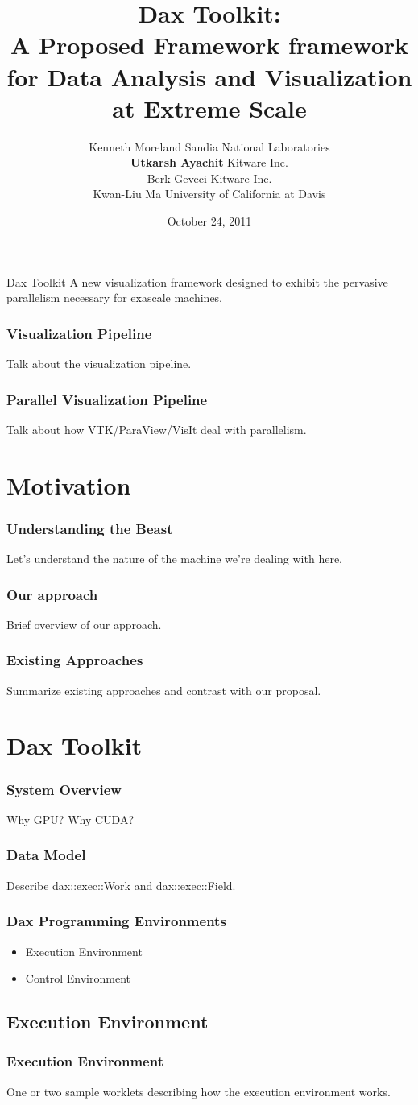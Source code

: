 \documentclass{beamer}
\title{\textbf{Dax Toolkit}: \\
  A Proposed Framework framework for Data Analysis and Visualization \\
  at Extreme Scale}
\author{\small
  Kenneth Moreland {\tiny Sandia National Laboratories} \\
  \textbf{Utkarsh Ayachit} {\tiny Kitware Inc. } \\
  Berk Geveci {\tiny Kitware Inc. }\\
  Kwan-Liu Ma {\tiny University of California at Davis}
}
\date {October 24, 2011}
\begin{document}
\frame{\titlepage}


\frame
{
  \begin{beamerboxesrounded}{Dax Toolkit}
  A new visualization framework designed to exhibit the pervasive parallelism
    necessary for exascale machines.
  \end{beamerboxesrounded}
}

\frame
{
  \frametitle{Visualization Pipeline}
  Talk about the visualization pipeline.
}

\frame
{
  \frametitle{Parallel Visualization Pipeline}
  Talk about how VTK/ParaView/VisIt deal with parallelism.
}

\section{Motivation}

\frame
{
  \frametitle{Understanding the Beast}
  Let's understand the nature of the machine we're dealing with here.
}

\frame
{
  \frametitle{Our approach}
  Brief overview of our approach.
}

\frame
{
  \frametitle{Existing Approaches}
  Summarize existing approaches and contrast with our proposal.
}

\section{Dax Toolkit}

\frame
{
  \frametitle{System Overview}
  Why GPU? Why CUDA?
}

\frame
{
  \frametitle{Data Model}
  Describe dax::exec::Work and dax::exec::Field.
}

\frame
{
  \frametitle{Dax Programming Environments}
  \begin{itemize}
  \item Execution Environment
  \item Control Environment
  \end{itemize}
}

\subsection{Execution Environment}
\frame
{
  \frametitle{Execution Environment}
  One or two sample worklets describing how the execution environment works.
}
\end{document}
